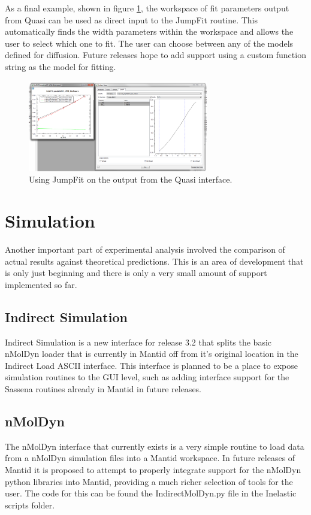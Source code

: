 \documentclass[paper=a4, fontsize=11pt]{scrartcl}	%
\numberwithin{equation}{section}															%
\numberwithin{figure}{section}																%
\numberwithin{table}{section}																%
\begin{document}
As a final example, shown in figure \ref{fig:iris-bayes-jumpfit}, the workspace of fit parameters output from Quasi can be used as direct input to the JumpFit routine. This automatically finds the width parameters within the workspace and allows the user to select which one to fit. The user can choose between any of the models defined for diffusion. Future releases hope to add support using a custom function string as the model for fitting.

\begin{figure}[H]
\centering
\includegraphics[width=0.7\textwidth]{img/iris-bayes-jumpfit.png}
\caption{Using JumpFit on the output from the Quasi interface.}
\label{fig:iris-bayes-jumpfit}
\end{figure}


\section{Simulation}
\label{sec:simulation}
Another important part of experimental analysis involved the comparison of actual results against theoretical predictions. This is an area of development that is only just beginning and there is only a very small amount of support implemented so far.

\subsection{Indirect Simulation}
Indirect Simulation is a new interface for release 3.2 that splits the basic nMolDyn loader that is currently in Mantid off from it's original location in the Indirect Load ASCII interface. This interface is planned to be a place to expose simulation routines to the GUI level, such as adding interface support for the Sassena routines already in Mantid in future releases.

\subsection{nMolDyn}
The nMolDyn interface that currently exists is a very simple routine to load data from a nMolDyn simulation files into a Mantid workspace. In future releases of Mantid it is proposed to attempt to properly integrate support for the nMolDyn python libraries into Mantid, providing a much richer selection of tools for the user. The code for this can be found the IndirectMolDyn.py file in the Inelastic scripts folder.
\end{document}
